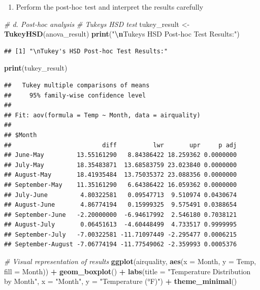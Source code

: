 \documentclass[
]{article}
\newenvironment{Shaded}{\begin{snugshade}}{\end{snugshade}}
\newcommand{\AttributeTok}[1]{\textcolor[rgb]{0.13,0.29,0.53}{#1}}
\newcommand{\CommentTok}[1]{\textcolor[rgb]{0.56,0.35,0.01}{\textit{#1}}}
\newcommand{\FunctionTok}[1]{\textcolor[rgb]{0.13,0.29,0.53}{\textbf{#1}}}
\newcommand{\NormalTok}[1]{#1}
\newcommand{\OtherTok}[1]{\textcolor[rgb]{0.56,0.35,0.01}{#1}}
\newcommand{\SpecialCharTok}[1]{\textcolor[rgb]{0.81,0.36,0.00}{\textbf{#1}}}
\newcommand{\StringTok}[1]{\textcolor[rgb]{0.31,0.60,0.02}{#1}}
\providecommand{\tightlist}{%
  \setlength{\itemsep}{0pt}\setlength{\parskip}{0pt}}
\begin{document}
\begin{enumerate}
\def\labelenumi{\alph{enumi}.}
\setcounter{enumi}{3}
\tightlist
\item
  Perform the post-hoc test and interpret the results carefully
\end{enumerate}

\begin{Shaded}
\begin{Highlighting}[]
\CommentTok{\# d. Post{-}hoc analysis}
\CommentTok{\# Tukey\textquotesingle{}s HSD test}
\NormalTok{tukey\_result }\OtherTok{\textless{}{-}} \FunctionTok{TukeyHSD}\NormalTok{(anova\_result)}
\FunctionTok{print}\NormalTok{(}\StringTok{"}\SpecialCharTok{\textbackslash{}n}\StringTok{Tukey\textquotesingle{}s HSD Post{-}hoc Test Results:"}\NormalTok{)}
\end{Highlighting}
\end{Shaded}

\begin{verbatim}
## [1] "\nTukey's HSD Post-hoc Test Results:"
\end{verbatim}

\begin{Shaded}
\begin{Highlighting}[]
\FunctionTok{print}\NormalTok{(tukey\_result)}
\end{Highlighting}
\end{Shaded}

\begin{verbatim}
##   Tukey multiple comparisons of means
##     95% family-wise confidence level
## 
## Fit: aov(formula = Temp ~ Month, data = airquality)
## 
## $Month
##                         diff          lwr       upr     p adj
## June-May         13.55161290   8.84386422 18.259362 0.0000000
## July-May         18.35483871  13.68583759 23.023840 0.0000000
## August-May       18.41935484  13.75035372 23.088356 0.0000000
## September-May    11.35161290   6.64386422 16.059362 0.0000000
## July-June         4.80322581   0.09547713  9.510974 0.0430674
## August-June       4.86774194   0.15999325  9.575491 0.0388654
## September-June   -2.20000000  -6.94617992  2.546180 0.7038121
## August-July       0.06451613  -4.60448499  4.733517 0.9999995
## September-July   -7.00322581 -11.71097449 -2.295477 0.0006215
## September-August -7.06774194 -11.77549062 -2.359993 0.0005376
\end{verbatim}

\begin{Shaded}
\begin{Highlighting}[]
\CommentTok{\# Visual representation of results}
\FunctionTok{ggplot}\NormalTok{(airquality, }\FunctionTok{aes}\NormalTok{(}\AttributeTok{x =}\NormalTok{ Month, }\AttributeTok{y =}\NormalTok{ Temp, }\AttributeTok{fill =}\NormalTok{ Month)) }\SpecialCharTok{+}
  \FunctionTok{geom\_boxplot}\NormalTok{() }\SpecialCharTok{+}
  \FunctionTok{labs}\NormalTok{(}\AttributeTok{title =} \StringTok{"Temperature Distribution by Month"}\NormalTok{,}
       \AttributeTok{x =} \StringTok{"Month"}\NormalTok{,}
       \AttributeTok{y =} \StringTok{"Temperature (°F)"}\NormalTok{) }\SpecialCharTok{+}
  \FunctionTok{theme\_minimal}\NormalTok{()}
\end{Highlighting}
\end{Shaded}
\end{document}
